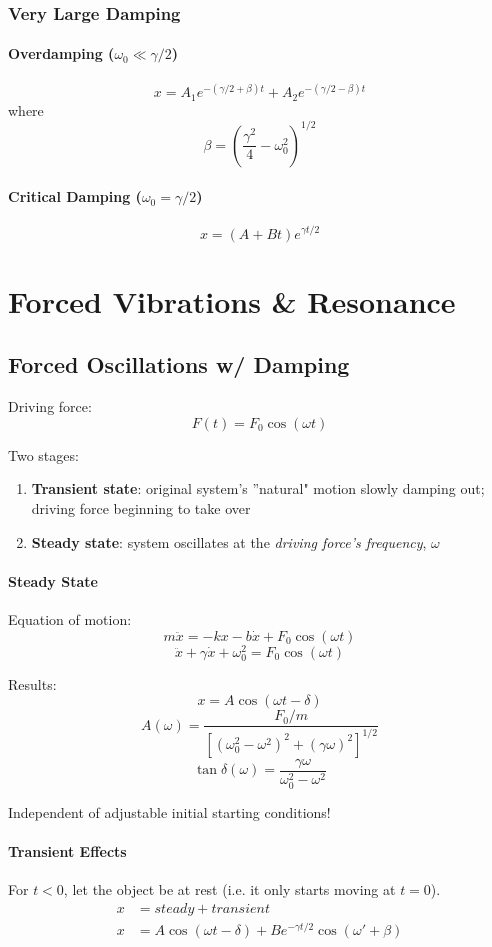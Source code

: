 \documentclass[11pt,letterpaper,titlepage,oneside]{book}
\begin{document}
\subsection{Very Large Damping}
\subsubsection{Overdamping ($ \omega_0 \ll \gamma/2 $)}
\[ x = A_1 e^{-(\gamma/2 + \beta)t} + A_2 e^{-(\gamma/2-\beta)t} \]
where \[ \beta = \left(\frac{\gamma^2}{4}-\omega_0^2 \right)^{1/2} \]

\subsubsection{Critical Damping ($ \omega_0 = \gamma/2 $)}
\[ x = (A + Bt) e^{\gamma t/2}\]

\chapter{Forced Vibrations \& Resonance}
\section{Forced Oscillations w/ Damping}
Driving force:
\[ F(t) = F_0 \cos(\omega t) \]

Two stages:
\begin{enumerate}
\item \textbf{Transient state}: original system's ''natural" motion slowly damping out; driving force beginning to take over
\item \textbf{Steady state}: system oscillates at the \emph{driving force's frequency}, $\omega$
\end{enumerate}

\subsubsection{Steady State}

Equation of motion:
\[ m\ddot{x} = -kx - b\dot{x} + F_0 \cos(\omega t) \]
\[ \ddot{x} + \gamma\dot{x} + \omega_0^2 = F_0 \cos(\omega t) \]

Results: 
\[ x = A \cos (\omega t - \delta) \]
\[ A(\omega) = \frac{F_0/m}{[(\omega_0^2 - \omega^2)^2 + (\gamma\omega)^2]^{1/2}} \]
\[ \tan \delta (\omega) = \frac{\gamma\omega}{\omega_0^2 - \omega^2}\]

Independent of adjustable initial starting conditions!

\subsubsection{Transient Effects}
For $t<0$, let the object be at rest (i.e. it only starts moving at $t=0$).
\begin{align*}
x &= steady + transient \\
x &= A \cos (\omega t - \delta) + B e^{-\gamma t/2} \cos(\omega' + \beta)
\end{align*}
\end{document}
